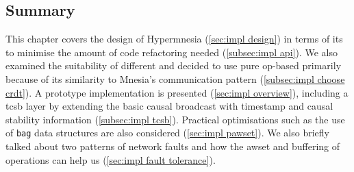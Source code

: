 \subsection{Summary}

This chapter covers the design of Hypermnesia (\cref{sec:impl design}) 
in terms of its  to minimise the amount of code refactoring 
needed (\cref{subsec:impl api}). We also examined the suitability 
of different  and decided to use pure op-based 
primarily because of its similarity to Mnesia's communication 
pattern (\cref{subsec:impl choose crdt}). A prototype implementation 
is presented (\cref{sec:impl overview}), including
a \acrlong{tcsb} layer by extending the basic causal broadcast with timestamp and
causal stability information (\cref{subsec:impl tcsb}). Practical optimisations
such as the use of \texttt{bag} data structures are also considered (\cref{sec:impl pawset}). 
We also briefly talked about two patterns of network faults and how the \acrshort{awset}
and buffering of operations can help us (\cref{sec:impl fault tolerance}).

